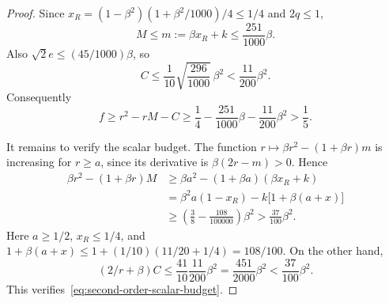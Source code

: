 \documentclass[11pt]{article}
\numberwithin{equation}{section}
\begin{document}
\begin{proof}
Since $x_R=(1-\beta^2)(1+\beta^2/1000)/4\le1/4$ and $2q\le1$,
\[
 M\le m:=\beta x_R+k\le\frac{251}{1000}\beta.
\]
Also $\sqrt2e\le(45/1000)\beta$, so
\[
 C\le\frac1{10}\sqrt{\frac{296}{1000}}\,\beta^2
 <\frac{11}{200}\beta^2.
\]
Consequently
\[
 f\ge r^2-rM-C
 \ge\frac14-\frac{251}{1000}\beta-\frac{11}{200}\beta^2
 >\frac15.
\]

It remains to verify the scalar budget. The function
$r\mapsto\beta r^2-(1+\beta r)m$ is increasing for $r\ge a$,
since its derivative is $\beta(2r-m)>0$. Hence
\begin{align*}
 \beta r^2-(1+\beta r)M
 &\ge\beta a^2-(1+\beta a)(\beta x_R+k)\\
 &=\beta^2a(1-x_R)-k\bigl[1+\beta(a+x)\bigr]\\
 &\ge\left(\frac38-\frac{108}{100000}\right)\beta^2
 >\frac{37}{100}\beta^2.
\end{align*}
Here $a\ge1/2$, $x_R\le1/4$, and
$1+\beta(a+x)\le1+(1/10)(11/20+1/4)=108/100$.
On the other hand,
\[
 (2/r+\beta)C
 \le\frac{41}{10}\frac{11}{200}\beta^2
 =\frac{451}{2000}\beta^2
 <\frac{37}{100}\beta^2.
\]
This verifies~\eqref{eq:second-order-scalar-budget}.
\end{proof}
\end{document}
